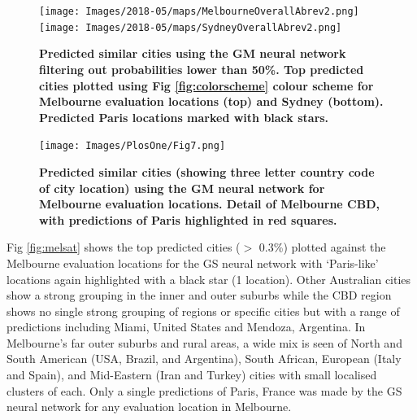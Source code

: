 \documentclass[Crown,sageh,times]{sagej}
\begin{document}
\begin{figure}[!htbp]
\centering   
\texttt{[image: Images/2018-05/maps/MelbourneOverallAbrev2.png]} 
\texttt{[image: Images/2018-05/maps/SydneyOverallAbrev2.png]}  
\caption{  \bf Predicted similar cities using the GM neural network filtering out probabilities lower than 50\%. Top predicted cities plotted using Fig \ref{fig:colorscheme} colour scheme for Melbourne evaluation locations (top) and Sydney (bottom). Predicted Paris locations marked with black stars.}    
 \label{fig:melmaps2}  
\end{figure} 


\begin{figure}[!htbp]
\centering     
\texttt{[image: Images/PlosOne/Fig7.png]} 
\caption{\bf Predicted similar cities (showing three letter country code of city location) using the GM neural network for Melbourne evaluation locations. Detail of Melbourne CBD, with predictions of Paris highlighted in red squares.}    
 \label{fig:melmapscbd}  
\end{figure} 


Fig \ref{fig:melsat} shows the top predicted cities ($>$ 0.3\%) plotted against the Melbourne evaluation locations for the GS neural network with `Paris-like' locations again highlighted with a black star (1 location). Other Australian cities show a strong grouping in the inner and outer suburbs while the CBD region shows no single strong grouping of regions or specific cities but with a range of predictions including Miami, United States and Mendoza, Argentina. In Melbourne's far outer suburbs and rural areas, a wide mix is seen of North and South American (USA, Brazil, and Argentina), South African, European (Italy and Spain), and Mid-Eastern (Iran and Turkey) cities with small localised clusters of each. Only a single predictions of Paris, France was made by the GS neural network for any evaluation location in Melbourne.
\end{document}
